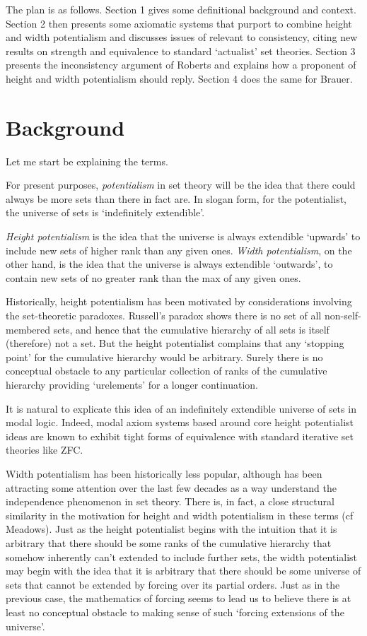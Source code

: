 \documentclass{article}
\begin{document}
The plan is as follows. 
Section 1 gives some definitional background and context. 
Section 2 then presents some axiomatic systems that purport to 
combine height  and width  potentialism and discusses
issues of relevant to consistency, citing new results
on strength and equivalence to standard `actualist' 
set theories. Section 3 presents the 
inconsistency argument of Roberts and explains 
how a proponent of height and width potentialism should reply.
Section 4 does the same for Brauer.

\section{Background}
Let me start be explaining the terms. 

For present purposes, \emph{potentialism} in set theory 
will be the idea that there could always be 
more sets than there in fact are. 
In slogan form, for the potentialist,  
the universe of sets is `indefinitely extendible'. 

\emph{Height potentialism} is the idea that the universe
is always extendible `upwards' to include 
new sets of higher rank than any given ones. 
\emph{Width potentialism}, on the other hand, 
is the idea that the universe is always extendible 
`outwards', to contain new sets of no greater rank 
than the max of any given ones.

Historically, height potentialism has been motivated 
by considerations involving the set-theoretic paradoxes. 
Russell's paradox shows there is no set of all 
non-self-membered sets, and hence that the cumulative 
hierarchy of all sets is itself (therefore) not a set. 
But the height potentialist complains that any 
`stopping point' for the cumulative hierarchy 
would be arbitrary. Surely there is no conceptual obstacle 
to any particular collection of ranks of the cumulative 
hierarchy providing `urelements' for a longer continuation.

It is natural to
explicate this idea of an indefinitely extendible 
universe of sets in modal logic. 
Indeed, modal axiom systems based around core height potentialist 
ideas are known to exhibit tight forms of 
equivalence with standard iterative set theories like ZFC.

Width potentialism has been historically 
less popular, although has been attracting 
some attention over the last few decades as a 
way understand the independence phenomenon in set 
theory. There is, in fact, a close structural 
similarity in the motivation for height  and 
width  potentialism in these terms (cf Meadows). 
Just as the height potentialist begins with the 
intuition that it is arbitrary that there should be 
some ranks of the cumulative hierarchy that somehow 
inherently can't extended to include further sets, 
the width  potentialist may begin with the idea that 
it is arbitrary that there should be some universe of 
sets that cannot be extended by forcing over its 
partial orders. Just as in the previous case, the 
mathematics of forcing seems to lead us to believe 
there is at least no conceptual obstacle to making 
sense of such `forcing extensions of the universe'.
\end{document}
